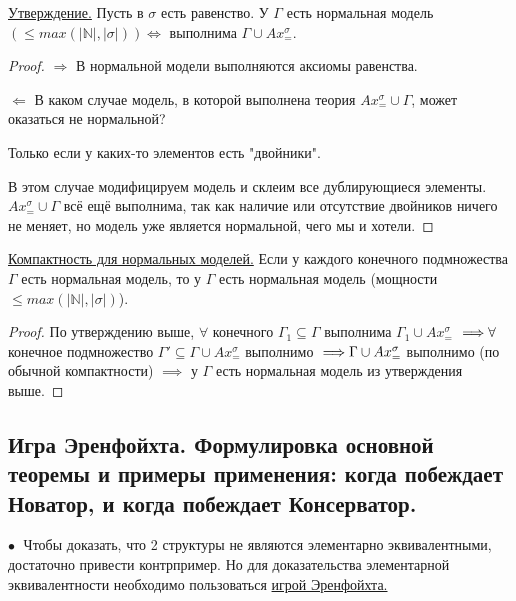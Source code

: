 \documentclass[a4paper, fleqn]{article}
\begin{document}
    \underline{Утверждение.} Пусть в $\sigma$ есть равенство. У $\Gamma$ есть нормальная модель $(\leq max(|\mathbb{N}|, |\sigma|)) \iff $  выполнима $\Gamma \cup Ax_{=}^{\sigma}.$
    
    \begin{proof}
    $\boxed{\Rightarrow}$ В нормальной модели выполняются аксиомы равенства.
    
    $\boxed{\Leftarrow}$ В каком случае модель, в которой выполнена теория $Ax_{=}^{\sigma} \cup \Gamma$, может оказаться не нормальной? 
    
    Только если у каких-то элементов есть "двойники". 
    
    В этом случае модифицируем модель и склеим все дублирующиеся элементы. $Ax_{=}^{\sigma} \cup \Gamma$ всё ещё выполнима, так как наличие или отсутствие двойников ничего не меняет, но модель уже является нормальной, чего мы и хотели.
    
    \end{proof}
    
    \doublespacing \underline{Компактность для нормальных моделей.} Если у каждого конечного подмножества $\Gamma$ есть нормальная модель, то у $\Gamma$ есть нормальная модель (мощности $\leq max (|\mathbb{N}| , | \sigma| )$).
    
    \begin{proof}
    
    По утверждению выше, $\forall$ конечного $\Gamma_1 \subseteq \Gamma$ выполнима $\Gamma_1 \cup Ax_{=}^{\sigma}$  $\implies \\ 
    \forall$ конечное подмножество $ \Gamma' \subseteq \Gamma \cup Ax_{=}^{\sigma} $ выполнимо $\implies \\ \Gamma \cup Ax_{=}^{\sigma}$ выполнимо (по обычной компактности) $\implies$ у $\Gamma$ есть нормальная модель из утверждения выше.
    
    \end{proof}

    
    \subsection{Игра Эренфойхта. Формулировка основной теоремы и примеры применения: когда побеждает Новатор, и когда побеждает Консерватор.}
    
    $\bullet \;$ Чтобы доказать, что 2 структуры не являются элементарно эквивалентными, достаточно привести контрпример. Но для доказательства элементарной эквивалентности необходимо пользоваться \underline{игрой Эренфойхта.}
    
\end{document}
